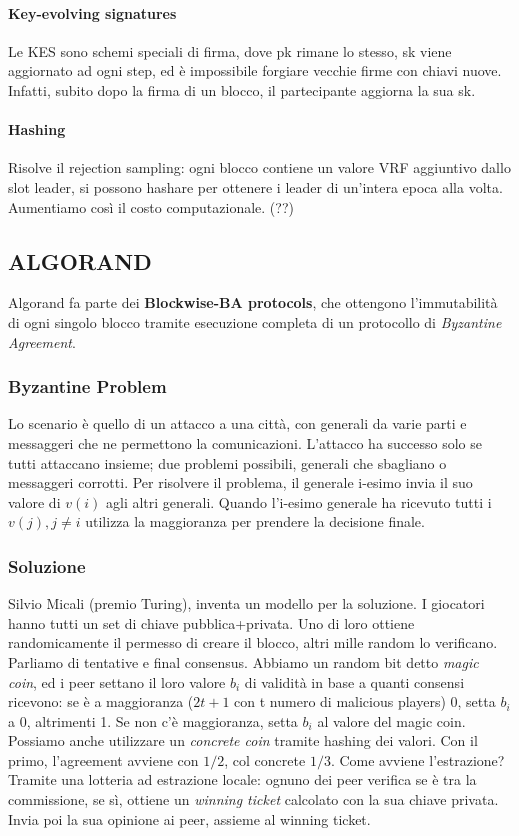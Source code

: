 \documentclass[11pt]{article}
\begin{document}
\paragraph{Key-evolving signatures} Le KES sono schemi speciali di firma, dove pk rimane lo stesso, sk viene aggiornato ad ogni step, ed è impossibile forgiare vecchie firme con chiavi nuove. Infatti, subito dopo la firma di un blocco, il partecipante aggiorna la sua sk.
\paragraph{Hashing} Risolve il rejection sampling: ogni blocco contiene un valore VRF aggiuntivo dallo slot leader, si possono hashare per ottenere i leader di un'intera epoca alla volta. Aumentiamo così il costo computazionale. (??)

\subsection{ALGORAND}
Algorand fa parte dei \textbf{Blockwise-BA protocols}, che ottengono l'immutabilità di ogni singolo blocco tramite esecuzione completa di un protocollo di \textit{Byzantine Agreement}.
\subsubsection{Byzantine Problem}
Lo scenario è quello di un attacco a una città, con generali da varie parti e messaggeri che ne permettono la comunicazioni. L'attacco ha successo solo se tutti attaccano insieme; due problemi possibili, generali che sbagliano o messaggeri corrotti. Per risolvere il problema, il generale i-esimo invia il suo valore di $v(i)$ agli altri generali. Quando l'i-esimo generale ha ricevuto tutti i $v(j), j \neq i$ utilizza la maggioranza per prendere la decisione finale. 
\subsubsection{Soluzione} 
Silvio Micali (premio Turing), inventa un modello per la soluzione. I giocatori hanno tutti un set di chiave pubblica+privata. Uno di loro ottiene randomicamente il permesso di creare il blocco, altri mille random lo verificano. Parliamo di tentative e final consensus. Abbiamo un random bit detto \textit{magic coin}, ed i peer settano il loro valore $b_i$ di validità in base a quanti consensi ricevono: se è a maggioranza ($2t+1$ con t numero di malicious players) 0, setta $b_i$ a 0, altrimenti 1. Se non c'è maggioranza, setta $b_i$ al valore del magic coin. Possiamo anche utilizzare un \textit{concrete coin} tramite hashing dei valori. Con il primo, l'agreement avviene con $1/2$, col concrete $1/3$. Come avviene l'estrazione? Tramite una lotteria ad estrazione locale: ognuno dei peer verifica se è tra la commissione, se sì, ottiene un \textit{winning ticket} calcolato con la sua chiave privata. Invia poi la sua opinione ai peer, assieme al winning ticket.
\end{document}
